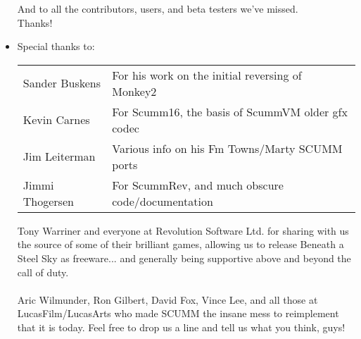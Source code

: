 \begin{itemize}
And to all the contributors, users, and beta testers we've missed.\\
Thanks!
\item Special thanks to:\\
  \begin{tabular}{ll}
    Sander Buskens  & For his work on the initial reversing of Monkey2\\
    Kevin Carnes    & For Scumm16, the basis of ScummVM older gfx codec\\
    Jim Leiterman   & Various info on his Fm Towns/Marty SCUMM ports\\
    Jimmi Thogersen & For ScummRev, and much obscure code/documentation\\
  \end{tabular}
  
  Tony Warriner and everyone at Revolution Software Ltd. for sharing
  with us the source of some of their brilliant games, allowing us to
  release Beneath a Steel Sky as freeware... and generally being
  supportive above and beyond the call of duty.\\
  ~\\
  Aric Wilmunder, Ron Gilbert, David Fox, Vince Lee, and all those at
  LucasFilm/LucasArts who made SCUMM the insane mess to reimplement
  that it is today. Feel free to drop us a line and tell us what you
  think, guys!
\end{itemize}

